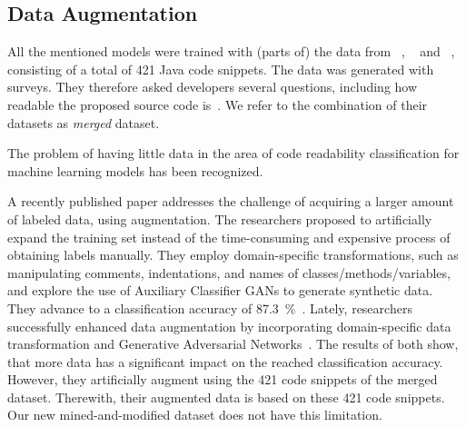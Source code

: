 \documentclass[%
class=scrreprt,
chapterprefix=false,%
open=right,%
twoside=false,%
paper=a4,%
logofile={Logo\_zentral\_farbig\_EN.png},%
thesistype=master,%
UKenglish,%
]{se2thesis}
\theoremstyle{definition}
\newcommand{\numMerged}{421\xspace}
\begin{document}
\subsection{Data Augmentation} \label{Data Augmentation}

	All the mentioned models were trained with (parts of) the data from \citeauthor{buse2009learning}~\cite{buse2009learning}, \citeauthor{dorn2012general}~\cite{dorn2012general} and \citeauthor{scalabrino2018comprehensive}~\cite{scalabrino2018comprehensive}, consisting of a total of \numMerged Java code snippets. The data was generated with surveys. They therefore asked developers several questions, including how readable the proposed source code is~\cite{buse2009learning, dorn2012general, scalabrino2018comprehensive}. We refer to the combination of their datasets as \textit{merged} dataset.
	
	The problem of having little data in the area of code readability classification for machine learning models has been recognized.
					
	A recently published paper addresses the challenge of acquiring a larger amount of labeled data, using augmentation. The researchers proposed to artificially expand the training set instead of the time-consuming and expensive process of obtaining labels manually. They employ domain-specific transformations, such as manipulating comments, indentations, and names of classes/methods/variables, and explore the use of Auxiliary Classifier GANs to generate synthetic data. They advance to a classification accuracy of 87.3~\%~\cite{mi2021effectiveness}.
	Lately, researchers successfully enhanced data augmentation by incorporating domain-specific data transformation and Generative Adversarial Networks~\cite{mi2022enhanced}.
	The results of both show, that more data has a significant impact on the reached classification accuracy. However, they artificially augment using the \numMerged code snippets of the merged dataset. Therewith, their augmented data is based on these \numMerged code snippets. Our new mined-and-modified dataset does not have this limitation.
	
\end{document}
